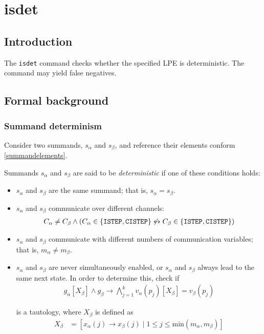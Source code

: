 \chapter{isdet} \label{isdet}

\section{Introduction}

The \texttt{isdet} command checks whether the specified LPE is deterministic.
The command may yield false negatives.

\section{Formal background}

\subsection{Summand determinism}

Consider two summands, $s_\alpha$ and $s_\beta$, and reference their elements conform \ref{summandelements}.

Summands $s_\alpha$ and $s_\beta$ are said to be \emph{deterministic} if one of these conditions holds:

\begin{itemize}
\item $s_\alpha$ and $s_\beta$ are the same summand; that is, $s_\alpha = s_\beta$.

\item $s_\alpha$ and $s_\beta$ communicate over different channels:
\begin{align*}
C_\alpha \neq C_\beta \land (C_\alpha \in \{\texttt{ISTEP}{}, \texttt{CISTEP}{}\} \not\leftrightarrow C_\beta \in \{\texttt{ISTEP}{}, \texttt{CISTEP}{}\})
\end{align*}

\item $s_\alpha$ and $s_\beta$ communicate with different numbers of communication variables; that is, $m_\alpha \neq m_\beta$.

\item $s_\alpha$ and $s_\beta$ are never simultaneously enabled, or $s_\alpha$ and $s_\beta$ always lead to the same next state.
In order to determine this, check if
\begin{align*}
g_\alpha[X_\beta] \land g_\beta \rightarrow \bigwedge\limits_{j=1}^{k} v_\alpha(p_j)[X_\beta] = v_\beta(p_j)
\end{align*}

is a tautology, where $X_\beta$ is defined as
\begin{align*}
X_{\beta} &= [x_\alpha(j) \rightarrow x_\beta(j) \;|\; 1 \leq j \leq \text{min}(m_\alpha, m_\beta)]
\end{align*}
\end{itemize}

